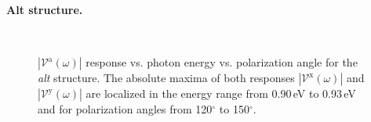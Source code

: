 \documentclass[prb,11pt,tightenlines,twocolumn,aps]{revtex4-1}
\begin{document}
\textbf{Alt structure.}
\begin{figure}[tb]
    \centering
    \\
    
    \caption{$|\mathcal{V}^{\mathrm{a}}(\omega)|$ response vs. photon energy vs.
    polarization angle for the \emph{alt} structure. The absolute maxima of both
    responses $|\mathcal{V}^{\mathrm{x}}(\omega)|$ and
    $|\mathcal{V}^{\mathrm{y}}(\omega)|$ are localized in the energy range from
    0.90\,eV to 0.93\,eV and for polarization angles from 120$^{\circ}$ to
    150$^{\circ}$.}
    \label{fig:alt-3d-vva}
\end{figure}
\end{document}
